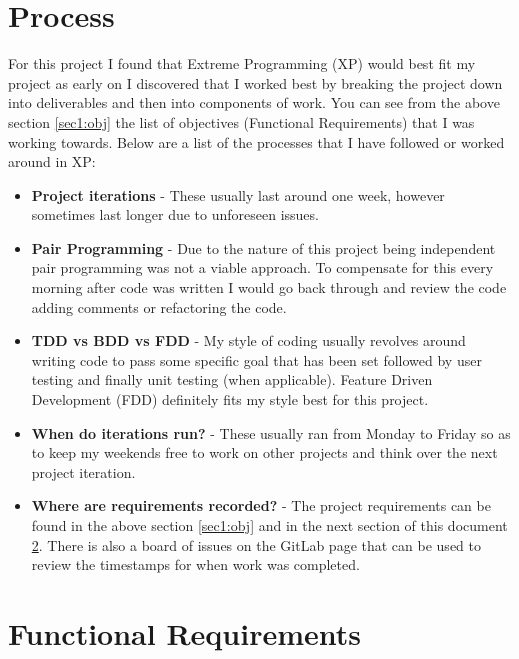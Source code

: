 \section{Process}\label{sec1:pro}
For this project I found that Extreme Programming (XP) would best fit my project as early on I discovered that I worked best by breaking the project down into deliverables and then into components of work. You can see from the above section \ref{sec1:obj} the list of objectives (Functional Requirements) that I was working towards. Below are a list of the processes that I have followed or worked around in XP:
\begin{itemize}
	\item \textbf{Project iterations} - These usually last around one week, however sometimes last longer due to unforeseen issues.
	\item \textbf{Pair Programming} - Due to the nature of this project being independent pair programming was not a viable approach. To compensate for this every morning after code was written I would go back through and review the code adding comments or refactoring the code.
	\item \textbf{TDD vs BDD vs FDD} - My style of coding usually revolves around writing code to pass some specific goal that has been set followed by user testing and finally unit testing (when applicable). Feature Driven Development (FDD) definitely fits my style best for this project.
	\item \textbf{When do iterations run?} - These usually ran from Monday to Friday so as to keep my weekends free to work on other projects and think over the next project iteration.
	\item \textbf{Where are requirements recorded?} - The project requirements can be found in the above section \ref{sec1:obj} and in the next section of this document \ref{sec1:fr}. There is also a board of issues on the GitLab page that can be used to review the timestamps for when work was completed.
\end{itemize}

\section{Functional Requirements}\label{sec1:fr}

